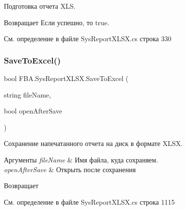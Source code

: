 Подготовка отчета X\+LS. 

\begin{DoxyReturn}{Возвращает}
Если успешно, то true.
\end{DoxyReturn}


См. определение в файле Sys\+Report\+X\+L\+S\+X.\+cs строка 330

\mbox{\label{class_f_b_a_1_1_sys_report_x_l_s_x_a37deb2e7bd2a76cedf96e996f622bf03}} 
\subsubsection{\texorpdfstring{Save\+To\+Excel()}{SaveToExcel()}}
{\footnotesize\ttfamily bool F\+B\+A.\+Sys\+Report\+X\+L\+S\+X.\+Save\+To\+Excel (\begin{DoxyParamCaption}\item[{string}]{file\+Name,  }\item[{bool}]{open\+After\+Save }\end{DoxyParamCaption})}





Сохранение напечатанного отчета на диск в формате X\+L\+SX. 


\begin{DoxyParams}{Аргументы}
{\em file\+Name} & Имя файла, куда сохраняем.\\
\hline
{\em open\+After\+Save} & Открыть после сохранения\\
\hline
\end{DoxyParams}
\begin{DoxyReturn}{Возвращает}

\end{DoxyReturn}


См. определение в файле Sys\+Report\+X\+L\+S\+X.\+cs строка 1115

\mbox{\label{class_f_b_a_1_1_sys_report_x_l_s_x_a20aca99b8556341421ac65f7393a87fd}} 
